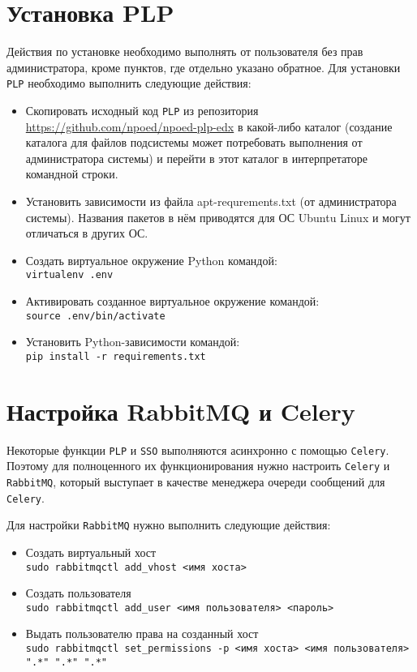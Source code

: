 \section{Установка PLP}
Действия по установке необходимо выполнять от пользователя без прав администратора, кроме пунктов, где отдельно указано обратное. Для установки \texttt{PLP} необходимо выполнить следующие действия:
\begin{itemize}
	\item Скопировать исходный код \texttt{PLP} из репозитория \url{https://github.com/npoed/npoed-plp-edx} в какой-либо каталог (создание каталога для файлов подсистемы может потребовать выполнения от администратора системы) и перейти в этот каталог в интерпретаторе командной строки.
	\item Установить зависимости из файла apt-requrements.txt (от администратора системы). Названия пакетов в нём приводятся для ОС Ubuntu Linux и могут отличаться в других ОС.
	\item Создать виртуальное окружение Python командой:\\
		\texttt{virtualenv .env}
	\item Активировать созданное виртуальное окружение командой:\\
		\texttt{source .env/bin/activate}
	\item Установить Python-зависимости командой:\\
		\texttt{pip install -r requirements.txt}
\end{itemize}
\section{Настройка RabbitMQ и Celery}
Некоторые функции \texttt{PLP} и \texttt{SSO} выполняются асинхронно с помощью \texttt{Celery}. Поэтому для полноценного их функционирования нужно
настроить \texttt{Celery} и \texttt{RabbitMQ}, который выступает в качестве менеджера очереди сообщений для \texttt{Celery}.

Для настройки \texttt{RabbitMQ} нужно выполнить следующие действия:
\begin{itemize}
	\item Создать виртуальный хост\\
		\texttt{sudo rabbitmqctl add\_vhost <имя хоста>}
	\item Создать пользователя\\
		\texttt{sudo rabbitmqctl add\_user <имя пользователя> <пароль>}
	\item Выдать пользователю права на созданный хост\\
		\texttt{sudo rabbitmqctl set\_permissions -p <имя хоста> <имя пользователя> ".*" ".*" ".*"}
\end{itemize}

